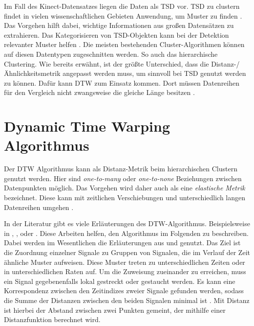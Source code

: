 Im Fall des Kinect-Datensatzes liegen die Daten als \ac{TSD} vor.
\ac{TSD} zu clustern findet in vielen wissenschaftlichen Gebieten Anwendung, um Muster zu finden \citep{aghabozorgi_time-series_2015}.
Das Vorgehen hilft dabei, wichtige Informationen aus großen Datensätzen zu extrahieren.
Das Kategorisieren von \ac{TSD}-Objekten kann bei der Detektion relevanter Muster helfen \citep{aghabozorgi_time-series_2015}.
Die meisten bestehenden Cluster-Algorithmen können auf diesen Datentypen zugeschnitten werden.
So auch das hierarchische Clustering.
Wie bereits erwähnt, ist der größte Unterschied, dass die Distanz-/ Ähnlichkeitsmetrik angepasst werden muss,
um sinnvoll bei \ac{TSD} genutzt werden zu können.
Dafür kann \ac*{DTW} zum Einsatz kommen.
Dort müssen Datenreihen für den Vergleich nicht zwangsweise die gleiche Länge besitzen \citep{warren_liao_clustering_2005}.

\section{Dynamic Time Warping Algorithmus}
\label{3-DTW}
Der \ac{DTW} Algorithmus kann als Distanz-Metrik beim hierarchischen Clustern genutzt werden.
Hier sind \emph{one-to-many} oder \emph{one-to-none} Beziehungen zwischen Datenpunkten möglich.
Das Vorgehen wird daher auch als eine \emph{elastische Metrik} bezeichnet.
Diese kann mit zeitlichen Verschiebungen und unterschiedlich langen Datenreihen umgehen \citep{aghabozorgi_time-series_2015}.

In der Literatur gibt es viele Erläuterungen des \ac{DTW}-Algorithmus.
Beispielsweise in \citet{mohammadzade_dynamic_2021}, \citet{warren_liao_clustering_2005},
\citet{aghabozorgi_time-series_2015} oder \citet{yu_dynamic_2019}.
Diese Arbeiten helfen, den Algorithmus im Folgenden zu beschreiben.
Dabei werden im Wesentlichen die Erläuterungen aus \citet{mohammadzade_dynamic_2021} und \citet{warren_liao_clustering_2005} genutzt.
Das Ziel ist die Zuordnung einzelner Signale zu Gruppen von Signalen,
die im Verlauf der Zeit ähnliche Muster aufweisen.
Diese Muster treten zu unterschiedlichen Zeiten oder in unterschiedlichen Raten auf.
Um die Zuweisung zueinander zu erreichen, muss ein Signal gegebenenfalls lokal gestreckt oder gestaucht werden.
Es kann eine Korrespondenz zwischen den Zeitindizes zweier Signale gefunden werden,
sodass die Summe der Distanzen zwischen den beiden Signalen minimal ist \citep{mohammadzade_dynamic_2021}.
Mit Distanz ist hierbei der Abstand zwischen zwei Punkten gemeint,
der mithilfe einer Distanzfunktion berechnet wird.

